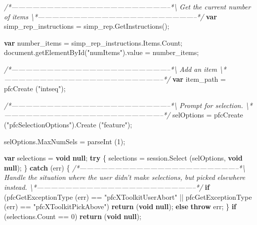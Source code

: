 \documentclass[]{article}
\newenvironment{Shaded}{}{}
\newcommand{\KeywordTok}[1]{\textcolor[rgb]{0.00,0.44,0.13}{\textbf{{#1}}}}
\newcommand{\DecValTok}[1]{\textcolor[rgb]{0.25,0.63,0.44}{{#1}}}
\newcommand{\StringTok}[1]{\textcolor[rgb]{0.25,0.44,0.63}{{#1}}}
\newcommand{\CommentTok}[1]{\textcolor[rgb]{0.38,0.63,0.69}{\textit{{#1}}}}
\newcommand{\OtherTok}[1]{\textcolor[rgb]{0.00,0.44,0.13}{{#1}}}
\newcommand{\FunctionTok}[1]{\textcolor[rgb]{0.02,0.16,0.49}{{#1}}}
\newcommand{\NormalTok}[1]{{#1}}
\begin{document}
\begin{Shaded}
\begin{Highlighting}[]
 \CommentTok{/*--------------------------------------------------------------------*\textbackslash{} }
\CommentTok{   Get the current number of items}
\CommentTok{ \textbackslash{}*--------------------------------------------------------------------*/}  
  \KeywordTok{var} \NormalTok{simp_rep_instructions = }\OtherTok{simp_rep}\NormalTok{.}\FunctionTok{GetInstructions}\NormalTok{();}
    
  \KeywordTok{var} \NormalTok{number_items = }\OtherTok{simp_rep_instructions}\NormalTok{.}\OtherTok{Items}\NormalTok{.}\FunctionTok{Count}\NormalTok{;}
  \OtherTok{document}\NormalTok{.}\FunctionTok{getElementById}\NormalTok{(}\StringTok{"numItems"}\NormalTok{).}\FunctionTok{value} \NormalTok{= number_items;         }

  
 \CommentTok{/*--------------------------------------------------------------------*\textbackslash{} }
\CommentTok{   Add an item  }
\CommentTok{ \textbackslash{}*--------------------------------------------------------------------*/}  
  \KeywordTok{var} \NormalTok{item_path = }\FunctionTok{pfcCreate} \NormalTok{(}\StringTok{"intseq"}\NormalTok{);}
  
  \CommentTok{/*--------------------------------------------------------------------*\textbackslash{} }
\CommentTok{  Prompt for selection.}
\CommentTok{\textbackslash{}*--------------------------------------------------------------------*/}  
  \NormalTok{selOptions = }\FunctionTok{pfcCreate} \NormalTok{(}\StringTok{"pfcSelectionOptions"}\NormalTok{).}\FunctionTok{Create} \NormalTok{(}\StringTok{"feature"}\NormalTok{);}
  
  \OtherTok{selOptions}\NormalTok{.}\FunctionTok{MaxNumSels} \NormalTok{= }\FunctionTok{parseInt} \NormalTok{(}\DecValTok{1}\NormalTok{);}
  
  \KeywordTok{var} \NormalTok{selections = }\KeywordTok{void} \KeywordTok{null}\NormalTok{;}
  \KeywordTok{try} \NormalTok{\{}
    \NormalTok{selections = }\OtherTok{session}\NormalTok{.}\FunctionTok{Select} \NormalTok{(selOptions, }\KeywordTok{void} \KeywordTok{null}\NormalTok{);}
  \NormalTok{\}}
  \KeywordTok{catch} \NormalTok{(err) \{}
\CommentTok{/*--------------------------------------------------------------------*\textbackslash{} }
\CommentTok{  Handle the situation where the  user didn't make selections, but picked }
\CommentTok{  elsewhere instead.}
\CommentTok{  \textbackslash{}*--------------------------------------------------------------------*/}  
  \KeywordTok{if} \NormalTok{(}\FunctionTok{pfcGetExceptionType} \NormalTok{(err) == }\StringTok{"pfcXToolkitUserAbort"} \NormalTok{|| }
    \FunctionTok{pfcGetExceptionType} \NormalTok{(err) == }\StringTok{"pfcXToolkitPickAbove"}\NormalTok{)}
      \KeywordTok{return} \NormalTok{(}\KeywordTok{void} \KeywordTok{null}\NormalTok{);}
    \KeywordTok{else}
      \KeywordTok{throw} \NormalTok{err;}
  \NormalTok{\}}
  \KeywordTok{if} \NormalTok{(}\OtherTok{selections}\NormalTok{.}\FunctionTok{Count} \NormalTok{== }\DecValTok{0}\NormalTok{)}
    \KeywordTok{return} \NormalTok{(}\KeywordTok{void} \KeywordTok{null}\NormalTok{);}


\end{Highlighting}
\end{Shaded}
\end{document}
